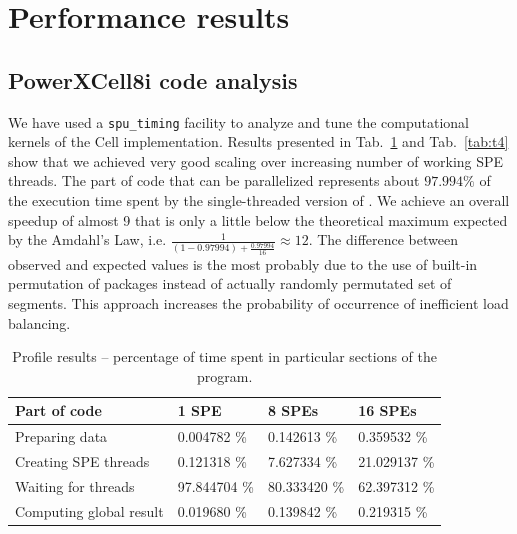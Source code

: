\section{Performance results}
\subsection{PowerXCell8i code analysis}
We have used a \texttt{spu\_timing} facility to analyze and tune the computational
kernels of the \prog{} Cell implementation.
Results presented in Tab.~\ref{tab:t3} and Tab.~\ref{tab:t4} show that we achieved
very good scaling over increasing number of working SPE threads.
The part of code that can be parallelized represents about $97.994\%$ of the execution
time spent by the single-threaded version of \prog{}.
We achieve an overall speedup of almost 9 that is only a little below the theoretical maximum expected by the Amdahl's Law, i.e. $\frac{1}{(1-0.97994) + \frac{0.97994}{16}}\approx12$.
The difference between observed and expected values is the most probably due to the use of built-in permutation of packages instead of actually randomly permutated set of segments. 
This approach increases the probability of occurrence of inefficient load balancing.
\begin{table}[htb]
\begin{footnotesize}
\caption{Profile results -- percentage of time spent in particular sections of the program.}
\label{tab:t3}
\newcommand{\m}{\hphantom{$-$}}
\newcommand{\cc}[1]{\multicolumn{1}{c}{#1}}
\renewcommand{\tabcolsep}{0.5pc} %
\renewcommand{\arraystretch}{1.2} %
\begin{tabular}{@{}llll}
\hline
\textbf{Part of code} & \textbf{1 SPE} & \textbf{8 SPEs} & \textbf{16 SPEs} \\
\hline
Preparing data & 0.004782 \% & 0.142613 \% & 0.359532 \% \\
Creating  SPE threads & 0.121318 \% & 7.627334 \% & 21.029137 \% \\
Waiting for threads & 97.844704 \% & 80.333420 \% & 62.397312 \% \\
Computing global result & 0.019680 \% & 0.139842 \% & 0.219315 \% \\
\hline
\end{tabular}\\[2pt]
\end{footnotesize}
\end{table}

